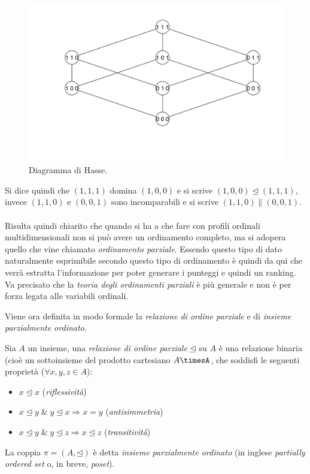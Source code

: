 \documentclass{report}
\begin{document}
\begin{figure}[H]
    \centering
    \includegraphics[width=12cm]{IMAGES/poset_4.png}
    \caption{Diagramma di Hasse.}
    \label{fig:roc}
\end{figure}

Si dice quindi che $(1,1,1)$ domina $(1,0,0)$ e si scrive $(1,0,0)\unlhd(1,1,1)$, invece $(1,1,0)$ e $(0,0,1)$ sono incomparabili e si scrive $(1,1,0)\parallel(0,0,1)$.
\\~\\
Risulta quindi chiarito che quando si ha a che fare con profili ordinali multidimensionali non si può avere un ordinamento completo, ma si adopera quello che vine chiamato \textit{ordinamento parziale}. Essendo questo tipo di dato naturalmente esprimibile secondo questo tipo di ordinamento è quindi da qui che verrà estratta l'informazione per poter generare i punteggi e quindi un ranking. Va precisato che la \textit{teoria degli ordinamenti parziali} è più generale e non è per forza legata alle variabili ordinali.


Viene ora definita in modo formale la \textit{relazione di ordine parziale} e di \textit{insieme parzialmente ordinato}.

\begin{definition}
Sia $A$ un insieme, una \textit{relazione di ordine parziale} $\unlhd$ su $A$ è una relazione binaria (cioè un sottoinsieme del prodotto cartesiano $A\timesA$, che soddisfi le seguenti proprietà ($\forall x, y, z \in A$):
\begin{itemize}
  \item $x\unlhd x$ (\textit{riflessività})
  \item $x\unlhd y\; \& \;y\unlhd x \Rightarrow x=y $ (\textit{antisimmetria})
  \item $x\unlhd y \; \& \; y \unlhd z \Rightarrow x\unlhd z$ (\textit{transitività})
\end{itemize}
La coppia $\pi = (A, \unlhd)$ è detta \textit{insieme parzialmente ordinato} (in inglese \textit{partially ordered set} o, in breve, \textit{poset}).
\end{definition}
\end{document}
